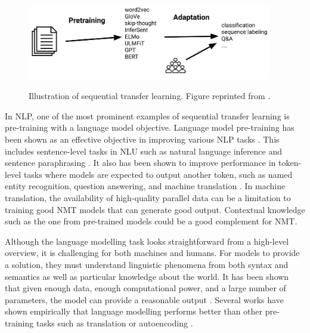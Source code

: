 \begin{figure}[h]
    {\includegraphics[width=0.95\textwidth]{img/sequential_tl.png}}
    \centering
    \caption{Illustration of sequential transfer learning. Figure reprinted from .}
    \label{img:seq_tl}
\end{figure}

In NLP, one of the most prominent examples of sequential transfer learning is pre-training with a language model objective. Language model pre-training has been shown as an effective objective in improving various NLP tasks . This includes sentence-level tasks in NLU such as natural language inference  and sentence paraphrasing . It also has been shown to improve performance in token-level tasks where models are expected to output another token, such as named entity recognition, question answering, and machine translation . In machine translation, the availability of high-quality parallel data can be a limitation to training good NMT models that can generate good output. Contextual knowledge such as the one from pre-trained models could be a good complement for NMT.

Although the language modelling task looks straightforward from a high-level overview, it is challenging for both machines and humans. For models to provide a solution, they must understand linguistic phenomena from both syntax and semantics as well as particular knowledge about the world. It has been shown that given enough data, enough computational power, and a large number of parameters, the model can provide a reasonable output . Several works have shown empirically that language modelling performs better than other pre-training tasks such as translation or autoencoding .

